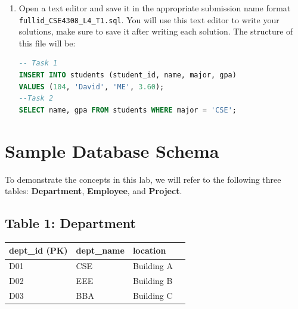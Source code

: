 \documentclass[12pt,a4paper]{article}
\begin{document}
\begin{enumerate}
After loading the SQL file, reconnect to PostgreSQL to verify that the tables have been created.

1. Reconnect to Your Database:

   \begin{lstlisting}[language=SQL]
   psql -h localhost -U student_12345 -d cse4308_12345
   \end{lstlisting}

2. Check Tables:

   Verify the tables have been created by listing them:

   \begin{lstlisting}[language=SQL]
   \dt
   \end{lstlisting}

3. View Table Data:

   Verify the data by running the following SQL queries:

   \begin{lstlisting}[language=SQL]
   SELECT * FROM <table_name>;
   \end{lstlisting}

\item Open a text editor and save it in the appropriate submission name format \\ \texttt{fullid\_CSE4308\_L4\_T1.sql}. You will use this text editor to write your solutions, make sure to save it after writing each solution. The structure of this file will be:
\begin{lstlisting}[language=SQL]
-- Task 1
INSERT INTO students (student_id, name, major, gpa)
VALUES (104, 'David', 'ME', 3.60);
--Task 2
SELECT name, gpa FROM students WHERE major = 'CSE';
\end{lstlisting}
\end{enumerate}
\newpage

\section{Sample Database Schema}
To demonstrate the concepts in this lab, we will refer to the following three tables: \textbf{Department}, \textbf{Employee}, and \textbf{Project}.

\subsection*{Table 1: Department}
\begin{table}[H]
\centering
\begin{tabular}{@{}lllc@{}}
\toprule
\textbf{dept\_id} (PK) & \textbf{dept\_name} & \textbf{location} \\ \midrule
D01 & CSE & Building A \\
D02 & EEE & Building B \\
D03 & BBA & Building C \\ \bottomrule
\end{tabular}
\end{table}
\end{document}
